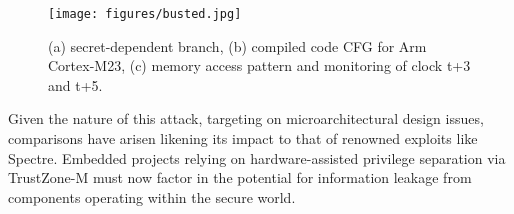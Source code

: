 \begin{figure*}
  \centering
  \texttt{[image: figures/busted.jpg]}
  \caption{(a) secret-dependent branch, (b) compiled code CFG for Arm Cortex-M23, (c) memory access pattern and monitoring of clock t+3 and t+5.}
  \label{fig:busted}
\end{figure*}

Given the nature of this attack, targeting on microarchitectural design
issues, comparisons have arisen likening its impact to that of renowned
exploits like Spectre. Embedded projects relying on
hardware-assisted privilege separation via TrustZone-M must now factor in
the potential for information leakage from components operating
within the secure world.

% 
% 

